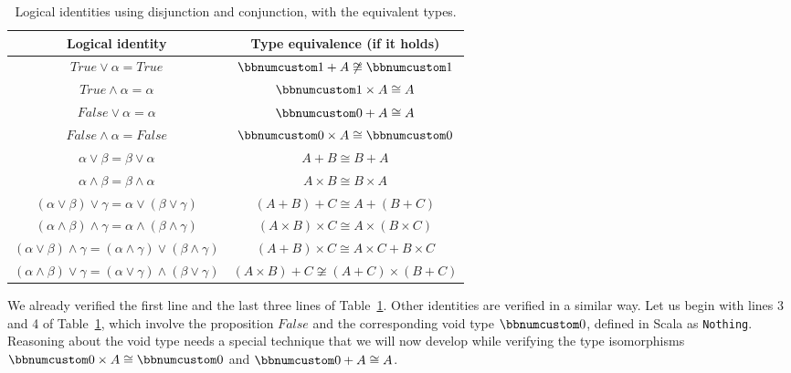 \begin{table}
\begin{centering}
\begin{tabular}{|c|c|}
\hline 
\textbf{\small{}Logical identity} & \textbf{\small{}Type equivalence (if it holds)}\tabularnewline
\hline 
\hline 
{\small{}$True\vee\alpha=True$} & {\small{}$\bbnum 1+A\not\cong\bbnum 1$}\tabularnewline
\hline 
{\small{}$True\wedge\alpha=\alpha$} & {\small{}$\bbnum 1\times A\cong A$}\tabularnewline
\hline 
{\small{}$False\vee\alpha=\alpha$} & {\small{}$\bbnum 0+A\cong A$}\tabularnewline
\hline 
{\small{}$False\wedge\alpha=False$} & {\small{}$\bbnum 0\times A\cong\bbnum 0$}\tabularnewline
\hline 
{\small{}$\alpha\vee\beta=\beta\vee\alpha$} & {\small{}$A+B\cong B+A$}\tabularnewline
\hline 
{\small{}$\alpha\wedge\beta=\beta\wedge\alpha$} & {\small{}$A\times B\cong B\times A$}\tabularnewline
\hline 
{\small{}$\left(\alpha\vee\beta\right)\vee\gamma=\alpha\vee\left(\beta\vee\gamma\right)$} & {\small{}$\left(A+B\right)+C\cong A+\left(B+C\right)$}\tabularnewline
\hline 
{\small{}$\left(\alpha\wedge\beta\right)\wedge\gamma=\alpha\wedge\left(\beta\wedge\gamma\right)$} & {\small{}$\left(A\times B\right)\times C\cong A\times\left(B\times C\right)$}\tabularnewline
\hline 
{\small{}$\left(\alpha\vee\beta\right)\wedge\gamma=\left(\alpha\wedge\gamma\right)\vee\left(\beta\wedge\gamma\right)$} & {\small{}$\left(A+B\right)\times C\cong A\times C+B\times C$}\tabularnewline
\hline 
{\small{}$\left(\alpha\wedge\beta\right)\vee\gamma=\left(\alpha\vee\gamma\right)\wedge\left(\beta\vee\gamma\right)$} & {\small{}$\left(A\times B\right)+C\not\cong\left(A+C\right)\times\left(B+C\right)$}\tabularnewline
\hline 
\end{tabular}
\par\end{centering}
\caption{Logical identities using disjunction and conjunction, with the equivalent
types.\label{tab:Logical-identities-with-disjunction-and-conjunction}}
\end{table}

We already verified the first line and the last three lines of Table~\ref{tab:Logical-identities-with-disjunction-and-conjunction}.
Other identities are verified in a similar way. Let us begin with
lines 3 and 4 of Table~\ref{tab:Logical-identities-with-disjunction-and-conjunction},
which involve the proposition $False$ and the corresponding void
type $\bbnum 0$, defined in Scala as \lstinline!Nothing!. Reasoning
about the void type needs a special technique that we will now develop
while verifying the type isomorphisms $\bbnum 0\times A\cong\bbnum 0$
and $\bbnum 0+A\cong A$.

